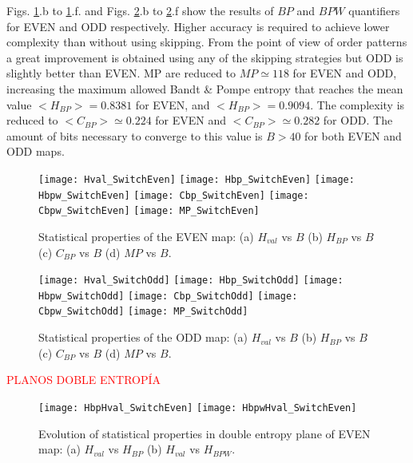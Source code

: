 Figs. \ref{fig:EVEN_QuantiB}.b to \ref{fig:EVEN_QuantiB}.f. and Figs. \ref{fig:ODD_QuantiB}.b to \ref{fig:ODD_QuantiB}.f show the results of $BP$ and $BPW$ quantifiers for EVEN and ODD respectively.
Higher accuracy is required to achieve lower complexity than without using skipping.
From the point of view of order patterns a great improvement is obtained using any of the skipping strategies but ODD is slightly better than EVEN.
MP are reduced to $MP\simeq 118$ for EVEN and  ODD, increasing the maximum allowed Bandt \& Pompe entropy that reaches the mean value $<H_{BP}> = 0.8381$ for EVEN, and $<H_{BP}> = 0.9094$.
The complexity is reduced to $<C_{BP}>\simeq 0.224$ for EVEN and  $<C_{BP}>\simeq 0.282$ for ODD.
The amount of bits necessary to converge to this value is $B>40$ for both EVEN and ODD maps.

\begin{figure}
	\texttt{[image: Hval\_SwitchEven]}
	\texttt{[image: Hbp\_SwitchEven]}
	\texttt{[image: Hbpw\_SwitchEven]}
	\texttt{[image: Cbp\_SwitchEven]}
	\texttt{[image: Cbpw\_SwitchEven]}
	\texttt{[image: MP\_SwitchEven]}
	\caption{Statistical properties of the EVEN map: (a) $H_{val}$ vs $B$ (b) $H_{BP}$ vs $B$ (c) $C_{BP}$ vs $B$ (d) $MP$ vs $B$.}
	\label{fig:EVEN_QuantiB}
\end{figure}

\begin{figure}
	\texttt{[image: Hval\_SwitchOdd]}
	\texttt{[image: Hbp\_SwitchOdd]}
	\texttt{[image: Hbpw\_SwitchOdd]}
	\texttt{[image: Cbp\_SwitchOdd]}
	\texttt{[image: Cbpw\_SwitchOdd]}
	\texttt{[image: MP\_SwitchOdd]}
	\caption{Statistical properties of the ODD map: (a) $H_{val}$ vs $B$ (b) $H_{BP}$ vs $B$ (c) $C_{BP}$ vs $B$ (d) $MP$ vs $B$.}
	\label{fig:ODD_QuantiB}
	\end{figure}

\textcolor{red}{PLANOS DOBLE ENTROPÍA}

\begin{figure}
	\texttt{[image: HbpHval\_SwitchEven]}
	\texttt{[image: HbpwHval\_SwitchEven]}
	\caption{Evolution of statistical properties in double entropy plane of EVEN map: (a) $H_{val}$ vs $H_{BP}$ (b) $H_{val}$ vs $H_{BPW}$.}
	\label{fig:EVEN_HH}
\end{figure}

